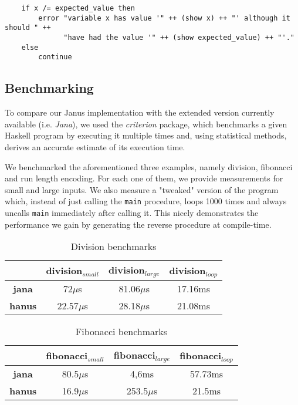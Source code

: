 \documentclass[12pt,a4paper]{article}
\newcommand{\inlinecode}[1]{\texttt{#1}}
\begin{document}
\begin{verbatim}
    if x /= expected_value then
        error "variable x has value '" ++ (show x) ++ "' although it should " ++
              "have had the value '" ++ (show expected_value) ++ "'."
    else
        continue
\end{verbatim}
    
\subsection{Benchmarking}
To compare our Janus implementation with the extended version currently available (i.e. \textit{Jana}), we used the \textit{criterion} package, which benchmarks a given Haskell program by executing it multiple times and, using statistical methods, derives an accurate estimate of its execution time.

We benchmarked the aforementioned three examples, namely division, fibonacci and run length encoding. For each one of them, we provide measurements for small and large inputs. We also measure a "tweaked" version of the program which, instead of just calling the \inlinecode{main} procedure, loops 1000 times and always uncalls \inlinecode{main} immediately after calling it. This nicely demonstrates the performance we gain by generating the reverse procedure at compile-time.

\begin{table}[h!]
\centering
\begin{tabular}{|c | c | c | c|}
\hline
& division$_{small}$ & division$_{large}$ & division$_{loop}$ \\
\hline
\textbf{jana} & 72$\mu$s & 81.06$\mu$s & 17.16ms \\
\textbf{hanus} & 22.57$\mu$s & 28.18$\mu$s & 21.08ms\\
\hline
\end{tabular}
\caption{Division benchmarks}
\end{table}

\begin{table}[h!]
\centering
\begin{tabular}{|c | c | c | c|}
\hline
& fibonacci$_{small}$ & fibonacci$_{large}$ & fibonacci$_{loop}$ \\
\hline
\textbf{jana} & 80.5$\mu$s & 4,6ms & 57.73ms \\
\textbf{hanus} & 16.9$\mu$s & 253.5$\mu$s & 21.5ms\\
\hline
\end{tabular}
\caption{Fibonacci benchmarks}
\end{table}
\end{document}
